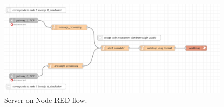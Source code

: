 \documentclass[]{article}
\begin{document}
\begin{figure}[h!]
	\includegraphics[scale=0.3]{./images/tt_server_arc.png}
	\caption{Server on Node-RED flow.}\label{tt-fig:2}
\end{figure}
\end{document}
